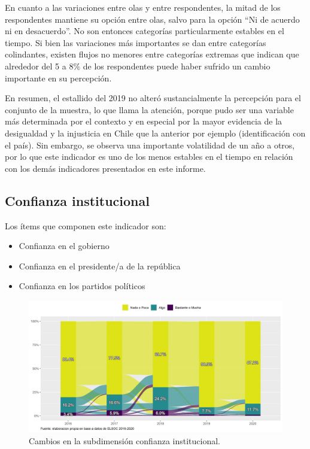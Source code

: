 \documentclass[
  12pt,
]{book}
\begin{document}
En cuanto a las variaciones entre olas y entre respondentes, la mitad de los respondentes mantiene su opción entre olas, salvo para la opción ``Ni de acuerdo ni en desacuerdo''. No son entonces categorías particularmente estables en el tiempo. Si bien las variaciones más importantes se dan entre categorías colindantes, existen flujos no menores entre categorías extremas que indican que alrededor del 5 a 8\% de los respondentes puede haber sufrido un cambio importante en su percepción.

En resumen, el estallido del 2019 no alteró sustancialmente la percepción para el conjunto de la muestra, lo que llama la atención, porque pudo ser una variable más determinada por el contexto y en especial por la mayor evidencia de la desigualdad y la injusticia en Chile que la anterior por ejemplo (identificación con el país). Sin embargo, se observa una importante volatilidad de un año a otros, por lo que este indicador es uno de los menos estables en el tiempo en relación con los demás indicadores presentados en este informe.

\hypertarget{confianza-institucional}{%
\subsection{Confianza institucional}\label{confianza-institucional}}

Los ítems que componen este indicador son:

\begin{itemize}
\item
  Confianza en el gobierno
\item
  Confianza en el presidente/a de la república
\item
  Confianza en los partidos políticos
\end{itemize}

\begin{figure}[H]

{\centering \includegraphics[width=1\linewidth,height=1\textheight]{output/graphs/alluvial_conf_institucional} 

}

\caption{Cambios en la subdimensión confianza institucional.}\label{fig:alluvial-conf-institucional}
\end{figure}
\end{document}
